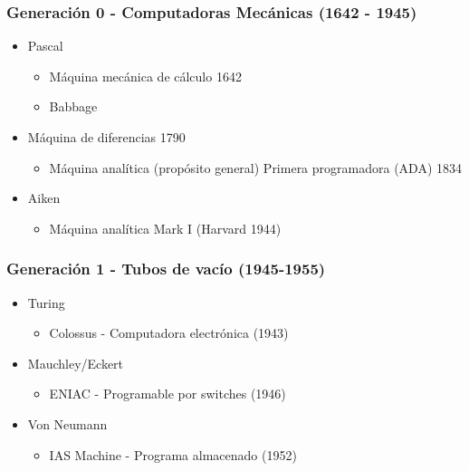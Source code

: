 \subsubsection{Generación 0 - Computadoras Mecánicas (1642 - 1945)}
\begin{itemize}
\item Pascal
	\begin{itemize}
	\item Máquina mecánica de cálculo 1642
	\item Babbage
	\end{itemize}
\item Máquina de diferencias 1790
	\begin{itemize}
	\item Máquina analítica (propósito general) Primera programadora (ADA) 1834
	\end{itemize}
\item Aiken
	\begin{itemize}
	\item Máquina analítica Mark I (Harvard 1944)
	\end{itemize}
\end{itemize}

\subsubsection{Generación 1 - Tubos de vacío (1945-1955)}
\begin{itemize}
\item Turing
	\begin{itemize}
	\item Colossus - Computadora electrónica (1943)
	\end{itemize}
\item Mauchley/Eckert
	\begin{itemize}
	\item ENIAC - Programable por switches (1946)
	\end{itemize}
\item Von Neumann
	\begin{itemize}
	\item IAS Machine - Programa almacenado (1952)
	\end{itemize}
\end{itemize}

